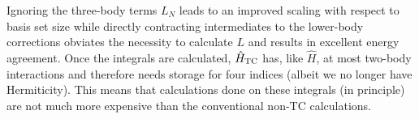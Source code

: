 Ignoring the three-body terms $L_N$ leads to an improved scaling with respect to basis set size while directly contracting intermediates to the lower-body corrections obviates the necessity to calculate $L$ and results in excellent energy agreement.\supercite{christlmaierXTC2023} Once the integrals are calculated, $\hat H_\mathrm{TC}$ has, like $\hat H$, at most two-body interactions and therefore needs storage for four indices (albeit we no longer have Hermiticity). This means that calculations done on these integrals (in principle) are not much more expensive than the conventional non-TC calculations.

\label{sec:xtc}
